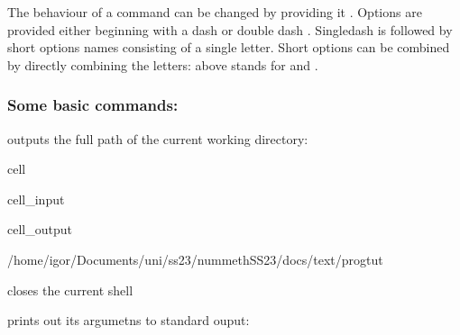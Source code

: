 \documentclass[a4paper,10pt,english]{jupyterBook}
\begin{document}
\sphinxAtStartPar
The behaviour of a command can be changed by providing it .
Options are provided either beginning with a dash \sphinxcode{\sphinxupquote{\sphinxhyphen{}}} or double dash \sphinxcode{\sphinxupquote{\sphinxhyphen{}\sphinxhyphen{}}}. Single\sphinxhyphen{}dash is followed by short options names consisting of a single letter. Short options can be combined by directly combining the letters:  above stands for  and .


\subsubsection{Some basic commands:}
\label{\detokenize{text/progtut/shell:some-basic-commands}}
\sphinxAtStartPar
{} outputs the full path of the current working directory:

\begin{sphinxuseclass}{cell}\begin{sphinxVerbatimInput}

\begin{sphinxuseclass}{cell_input}
\begin{sphinxVerbatim}[commandchars=\\\{\}]
\end{sphinxVerbatim}

\end{sphinxuseclass}\end{sphinxVerbatimInput}
\begin{sphinxVerbatimOutput}

\begin{sphinxuseclass}{cell_output}
\begin{sphinxVerbatim}[commandchars=\\\{\}]
/home/igor/Documents/uni/ss23/nummethSS23/docs/text/progtut
\end{sphinxVerbatim}

\end{sphinxuseclass}\end{sphinxVerbatimOutput}

\end{sphinxuseclass}
\sphinxAtStartPar
{} closes the current shell

\sphinxAtStartPar
{} prints out its argumetns to standard ouput:
\end{document}
